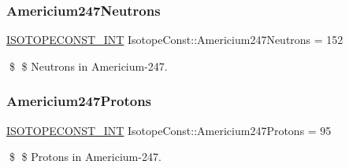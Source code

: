 \subsubsection{\texorpdfstring{Americium247\+Neutrons}{Americium247Neutrons}}
{\footnotesize\ttfamily \mbox{\hyperlink{group___isotope_const-_macros_ga5f18360b3e99483a35c32d789e62621c}{I\+S\+O\+T\+O\+P\+E\+C\+O\+N\+S\+T\+\_\+\+I\+NT}} Isotope\+Const\+::\+Americium247\+Neutrons = 152}

\$ \$ Neutrons in Americium-\/247. \mbox{\label{group___isotope_const-_americium-_am247_gab0b80c2e6ac476efd8f9adf2c1fe9b98}} 
\subsubsection{\texorpdfstring{Americium247\+Protons}{Americium247Protons}}
{\footnotesize\ttfamily \mbox{\hyperlink{group___isotope_const-_macros_ga5f18360b3e99483a35c32d789e62621c}{I\+S\+O\+T\+O\+P\+E\+C\+O\+N\+S\+T\+\_\+\+I\+NT}} Isotope\+Const\+::\+Americium247\+Protons = 95}

\$ \$ Protons in Americium-\/247. 
